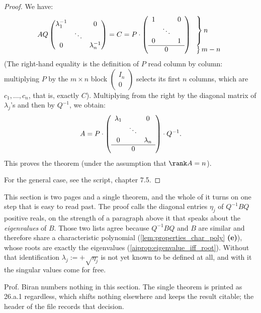 \begin{proof}
We have:
\[
A Q \begin{pmatrix} \lambda_1^{-1} & & 0 \\ & \ddots & \\ 0 & & \lambda_n^{-1} \end{pmatrix} = C = P \cdot 
\left(
\begin{array}{ccc}
1 & & 0 \\
& \ddots & \\
0 & & 1 \\
\hline
\multicolumn{3}{c}{0}
\end{array}
\right)
\begin{array}{l}
\left. \vphantom{\begin{matrix} 1 \\ \ddots \\ 1 \end{matrix}} \right\} n \\
\left. \vphantom{\begin{matrix} 0 \end{matrix}} \right\} m-n
\end{array}
\]
(The right-hand equality is the definition of $P$ read column by column: multiplying $P$ by the $m \times n$ block $\left(\begin{smallmatrix} I_n \\ 0 \end{smallmatrix}\right)$ selects its first $n$ columns, which are $c_1, \dots, c_n$, that is, exactly $C$).
Multiplying from the right by the diagonal matrix of $\lambda_j$'s and then by $Q^{-1}$, we obtain:
\[
A = P \cdot \left(
\begin{array}{ccc}
\lambda_1 & & 0 \\
& \ddots & \\
0 & & \lambda_n \\
\hline
\multicolumn{3}{c}{0}
\end{array}
\right) \cdot Q^{-1}.
\]
This proves the theorem (under the assumption that $\rank A = n$).

For the general case, see the script, chapter 7.5.
\end{proof}


\begin{ainote}
This section is two pages and a single theorem, and the whole of it turns on one
step that is easy to read past. The proof calls the diagonal entries $\eta_j$ of
$Q^{-1} B Q$ positive reals, on the strength of a paragraph above it that speaks
about the \emph{eigenvalues} of $B$. Those two lists agree because $Q^{-1} B Q$
and $B$ are similar and therefore share a characteristic polynomial
(\cref{lem:properties_char_poly} \textbf{(e)}), whose roots are exactly the
eigenvalues (\cref{aiprop:eigenvalue_iff_root}). Without that identification
$\lambda_j := +\sqrt{\eta_j}$ is not yet known to be defined at all, and with it
the singular values come for free.

Prof. Biran numbers nothing in this section. The single theorem is printed as
26.a.1 regardless, which shifts nothing elsewhere and keeps the result citable;
the header of the file records that decision.
\end{ainote}
